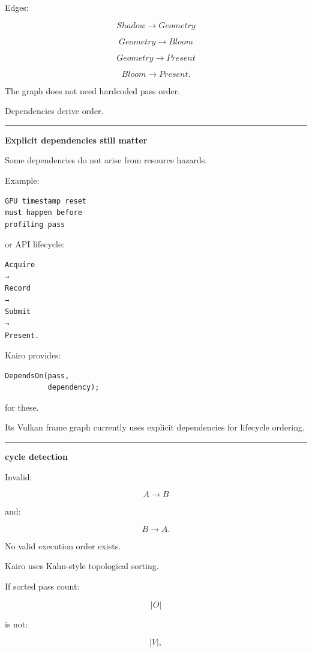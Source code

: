 Edges:

\[
Shadow\rightarrow Geometry
\]

\[
Geometry\rightarrow Bloom
\]

\[
Geometry\rightarrow Present
\]

\[
Bloom\rightarrow Present.
\]

The graph does not need hardcoded pass order.

Dependencies derive order.

\begin{center}\rule{0.5\linewidth}{0.5pt}\end{center}

\textbf{Explicit dependencies still matter}

Some dependencies do not arise from resource hazards.

Example:

\begin{verbatim}
GPU timestamp reset
must happen before
profiling pass
\end{verbatim}

or API lifecycle:

\begin{verbatim}
Acquire
→
Record
→
Submit
→
Present.
\end{verbatim}

Kairo provides:

\begin{verbatim}
DependsOn(pass,
          dependency);
\end{verbatim}

for these.

Its Vulkan frame graph currently uses explicit dependencies for lifecycle ordering.

\begin{center}\rule{0.5\linewidth}{0.5pt}\end{center}

\textbf{cycle detection}

Invalid:

\[
A\rightarrow B
\]

and:

\[
B\rightarrow A.
\]

No valid execution order exists.

Kairo uses Kahn-style topological sorting.

If sorted pass count:

\[
|O|
\]

is not:

\[
|V|,
\]

